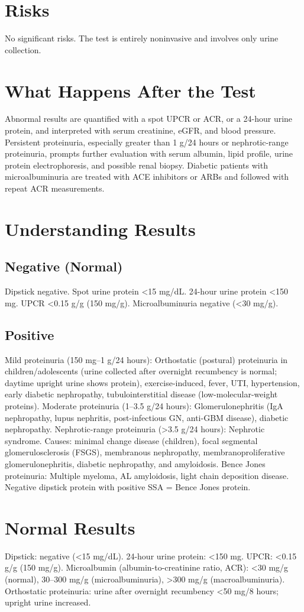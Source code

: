 \section*{Risks}
No significant risks. The test is entirely noninvasive and involves only urine collection.
\section*{What Happens After the Test}
Abnormal results are quantified with a spot UPCR or ACR, or a 24-hour urine protein, and interpreted with serum creatinine, eGFR, and blood pressure. Persistent proteinuria, especially greater than 1 g/24 hours or nephrotic-range proteinuria, prompts further evaluation with serum albumin, lipid profile, urine protein electrophoresis, and possible renal biopsy. Diabetic patients with microalbuminuria are treated with ACE inhibitors or ARBs and followed with repeat ACR measurements.
\section*{Understanding Results}
\subsection*{Negative (Normal)}
Dipstick negative. Spot urine protein <15 mg/dL. 24-hour urine protein <150 mg. UPCR <0.15 g/g (150 mg/g). Microalbuminuria negative (<30 mg/g).
\subsection*{Positive}
Mild proteinuria (150 mg--1 g/24 hours): Orthostatic (postural) proteinuria in children/adolescents (urine collected after overnight recumbency is normal; daytime upright urine shows protein), exercise-induced, fever, UTI, hypertension, early diabetic nephropathy, tubulointerstitial disease (low-molecular-weight proteins). Moderate proteinuria (1--3.5 g/24 hours): Glomerulonephritis (IgA nephropathy, lupus nephritis, post-infectious GN, anti-GBM disease), diabetic nephropathy. Nephrotic-range proteinuria (>3.5 g/24 hours): Nephrotic syndrome. Causes: minimal change disease (children), focal segmental glomerulosclerosis (FSGS), membranous nephropathy, membranoproliferative glomerulonephritis, diabetic nephropathy, and amyloidosis. Bence Jones proteinuria: Multiple myeloma, AL amyloidosis, light chain deposition disease. Negative dipstick protein with positive SSA = Bence Jones protein.
\section*{Normal Results}
Dipstick: negative (<15 mg/dL). 24-hour urine protein: <150 mg. UPCR: <0.15 g/g (150 mg/g). Microalbumin (albumin-to-creatinine ratio, ACR): <30 mg/g (normal), 30--300 mg/g (microalbuminuria), >300 mg/g (macroalbuminuria). Orthostatic proteinuria: urine after overnight recumbency <50 mg/8 hours; upright urine increased.
